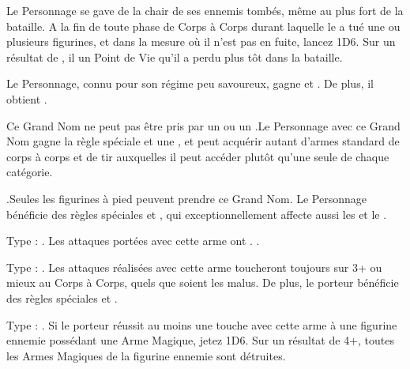 \begin{multicols}{2}
Le Personnage se gave de la chair de ses ennemis tombés, même au plus fort de la bataille. A la fin de toute phase de Corps à Corps durant laquelle le  a tué une ou plusieurs figurines, et dans la mesure où il n'est pas en fuite, lancez 1D6. Sur un résultat de , il  un Point de Vie qu'il a perdu plus tôt dans la bataille.

Le Personnage, connu pour son régime peu savoureux, gagne  et \stupidity{}. De plus, il obtient .

Ce Grand Nom ne peut pas être pris par un \wizard{} ou un \mammothhunter{}.\newline Le Personnage avec ce Grand Nom gagne la règle spéciale \weaponmaster{} et une \platearmour{}, et peut acquérir autant d'armes standard de corps à corps et de tir auxquelles il peut accéder plutôt qu'une seule de chaque catégorie.

.\newline Seules les figurines à pied peuvent prendre ce Grand Nom. Le Personnage bénéficie des règles spéciales \devastatingcharge{} et \thunderouscharge{}, qui exceptionnellement affecte aussi les \impacthits{} et le \stomp{}.

\endpricelistNSP
\end{multicols}

\closearmynewsection

\startarmymagicalitems

\armymagicalweapons

\startpricelist

Type : \gw{}. Les attaques portées avec cette arme ont . .

Type : \ironfist{}. Les attaques réalisées avec cette arme toucheront toujours sur 3+ ou mieux au Corps à Corps, quels que soient les malus. De plus, le porteur bénéficie des règles spéciales  et .

Type : \ironfist{}. Si le porteur réussit au moins une touche avec cette arme à une figurine ennemie possédant une Arme Magique, jetez 1D6. Sur un résultat de 4+, toutes les Armes Magiques de la figurine ennemie sont détruites.

